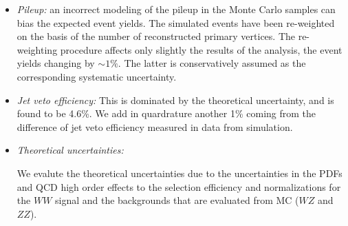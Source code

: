 \begin{itemize}
  \begin{itemize}
  \item Jet induced backgrounds, $\Wjets$ and $QCD$: the associated systematic
    uncertainty is 36\%.
  \item Top background: this background is estimated using $b$-tagged events and
    the $b$-tagging efficiency, which is measured in control regions in data.
    The associated systematic uncertainties are below $5\%$,
    while the statistical component is about $25\%$ for $\intlumi$.
  \item Drell-Yan background: The uncertainty arises from the limited knowledge of
    events with large $\met$ tails.
    We conservatively quantify such uncertainty from the variation of the ratio $R_{out/in}$
    (Eq.\ref{eq:dyest}) as a function of the $\met$ requirement,
    leading to an estimate of about $43\%$.
  \item Other backgrounds: The sub-dominant backgrounds are estimated from simulation
    with appropriate systematic uncertainties on their cross section.
    The theoretical uncertainties on the $\WZ$ and $\ZZ$ are estimated the same way as in the signal detailed in below. 
    These uncertainties must be augmented by the luminosity normalization uncertainty.
  \end{itemize}

\item {\it Pileup:} an incorrect modeling of the pileup in the Monte Carlo samples
can bias the expected event yields. The simulated events have been re-weighted
on the basis of the number of reconstructed
primary vertices. The re-weighting procedure affects only slightly the results of the analysis,
the event yields changing by $\sim1\%$. The latter is conservatively assumed as
the corresponding systematic uncertainty.

\item {\it Jet veto efficiency:}
This is dominated by the theoretical uncertainty, and is found to be 4.6\%. We add in 
quardrature another 1\% coming from the difference of jet veto efficiency measured in data 
from simulation. 

\item {\it Theoretical uncertainties:}

We evalute the theoretical uncertainties due to the uncertainties in the PDFs and 
QCD high order effects to the selection efficiency and normalizations 
for the $WW$ signal and the backgrounds that are evaluated from MC ($WZ$ and $ZZ$). 


\end{itemize}
